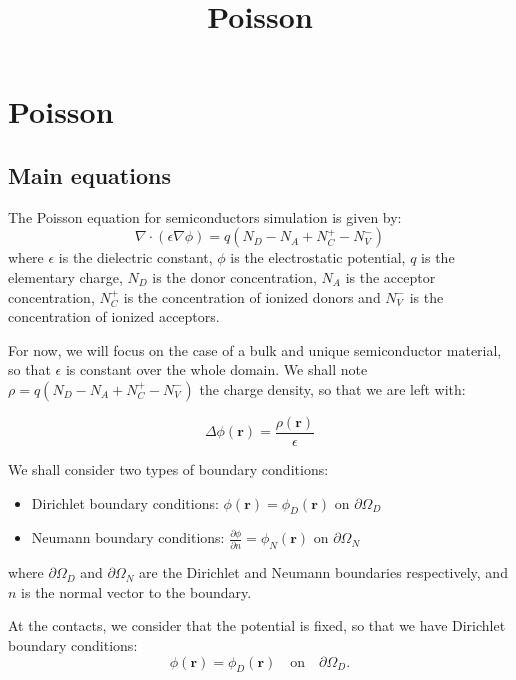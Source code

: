 \documentclass[]{article}
\title{Poisson}
\newcommand{\rv}{\mathbf{r}}
\begin{document}
\maketitle

\section{Poisson}

\subsection{Main equations}

The Poisson equation for semiconductors simulation is given by:
\begin{equation}
\label{eq:poisson}
\nabla \cdot \left( \epsilon \nabla \phi \right) = q \left( N_D - N_A + N_C^+ - N_V^- \right)
\end{equation}
where $\epsilon$ is the dielectric constant, $\phi$ is the electrostatic potential, $q$ is the elementary charge, $N_D$ is the donor concentration, $N_A$ is the acceptor concentration, $N_C^+$ is the concentration of ionized donors and $N_V^-$ is the concentration of ionized acceptors.

For now, we will focus on the case of a bulk and unique semiconductor material, so that $\epsilon$ is constant over the whole domain. 
We shall note $\rho = q \left( N_D - N_A + N_C^+ - N_V^- \right)$ the charge density, so that we are left with:

\begin{equation}
\label{eq:poisson2}
\Delta \phi(\rv) = \frac{\rho(\rv)}{\epsilon}
\end{equation}

We shall consider two types of boundary conditions:
\begin{itemize}
\item Dirichlet boundary conditions: $\phi(\rv) = \phi_D(\rv)$ on $\partial \Omega_D$
\item Neumann boundary conditions: $\frac{\partial \phi}{\partial n} = \phi_N(\rv)$ on $\partial \Omega_N$
\end{itemize}
where $\partial \Omega_D$ and $\partial \Omega_N$ are the Dirichlet and Neumann boundaries respectively, and $n$ is the normal vector to the boundary.

At the contacts, we consider that the potential is fixed, so that we have Dirichlet boundary conditions:
\begin{equation}
\label{eq:poisson3}
\phi(\rv) = \phi_D(\rv) \quad \text{on} \quad \partial \Omega_D.
\end{equation}
\end{document}

